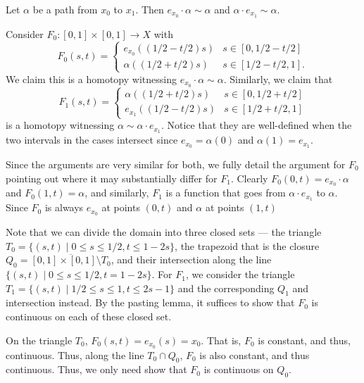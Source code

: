 \documentclass[12 pt, letterpaper]{hmcpset}
\begin{document}
\begin{problem}[12.7]
	Let $\alpha$ be a path from $x_{0}$ to $x_{1}$. Then $e_{x_{0}} \cdot \alpha \sim \alpha$ and $\alpha \cdot e_{x_{1}} \sim \alpha$.
\end{problem}

\begin{solution}
	Consider $F_{0} : [0, 1] \times [0, 1] \to X$ with
	\[
		F_{0}(s, t) = \begin{cases}
			e_{x_{0}}((1/2 - t/2)s) & s \in [0, 1/2 - t/2] \\
			\alpha((1/2 + t/2)s) & s \in [1/2 - t/2, 1].
		\end{cases}
	\]
	We claim this is a homotopy witnessing $e_{x_{0}} \cdot \alpha \sim \alpha$. Similarly, we claim that
	\[
		F_{1}(s, t) = \begin{cases}
			\alpha((1/2 + t/2)s) & s \in [0, 1/2 + t/2] \\
			e_{x_{1}}((1/2 - t/2) s) & s \in [1/2 + t/2, 1]
		\end{cases}
	\]
	is a homotopy witnessing $\alpha \sim \alpha \cdot e_{x_{1}}$. Notice that they are well-defined when the two intervals in the cases intersect since $e_{x_{0}} = \alpha(0)$ and $\alpha(1) = e_{x_{1}}$.

	Since the arguments are very similar for both, we fully detail the argument for $F_{0}$ pointing out where it may substantially differ for $F_{1}$. Clearly $F_{0}(0, t) = e_{x_{0}} \cdot \alpha$ and $F_{0}(1, t) = \alpha$, and similarly, $F_{1}$ is a function that goes from $\alpha \cdot e_{x_{1}}$ to $\alpha$. Since $F_{0}$ is always $e_{x_{0}}$ at points $(0, t)$ and $\alpha$ at points $(1, t)$

	Note that we can divide the domain into three closed sets --- the triangle $T_{0} = \{ (s, t) \mid 0 \le s \le 1/2, t \le 1 - 2s \}$, the trapezoid that is the closure $Q_{0} = \overline{[0, 1] \times [0, 1] \setminus T_{0}}$, and their intersection along the line $ \{ (s, t) \mid 0 \le s \le 1/2, t = 1 - 2 s \}$. For $F_{1}$, we consider the triangle $T_{1} = \{ (s, t) \mid 1/2 \le s \le 1, t \le 2s - 1 \}$ and the corresponding $Q_{1}$ and intersection instead. By the pasting lemma, it suffices to show that $F_{0}$ is continuous on each of these closed set.

	On the triangle $T_{0}$, $F_{0}(s, t) = e_{x_{0}}(s) = x_{0}$. That is, $F_{0}$ is constant, and thus, continuous. Thus, along the line $T_{0} \cap Q_{0}$, $F_{0}$ is also constant, and thus continuous. Thus, we only need show that $F_{0}$ is continuous on $Q_{0}$. 


\end{solution}
\end{document}
